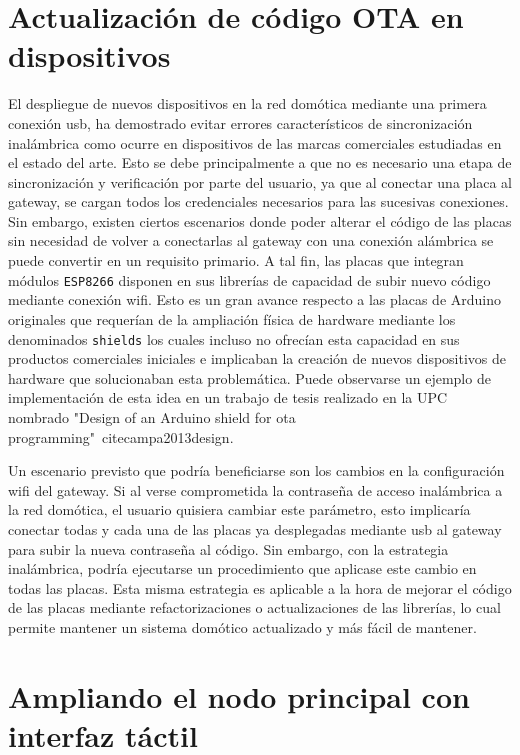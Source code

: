 \section{Actualización de código OTA en dispositivos}
\label{ch:Capitulo6.3}
El despliegue de nuevos dispositivos en la red domótica mediante una primera conexión \gls{usb}, ha demostrado evitar errores característicos de sincronización inalámbrica como ocurre en dispositivos de las marcas comerciales estudiadas en el estado del arte. Esto se debe principalmente a que no es necesario una etapa de sincronización y verificación por parte del usuario, ya que al conectar una placa al \gls{gateway}, se cargan todos los credenciales necesarios para las sucesivas conexiones. Sin embargo, existen ciertos escenarios donde poder alterar el código de las placas sin necesidad de volver a conectarlas al \gls{gateway} con una conexión alámbrica se puede convertir en un requisito primario. A tal fin, las placas que integran módulos \verb|ESP8266| disponen en sus librerías de capacidad de subir nuevo código mediante conexión \gls{wifi}. Esto es un gran avance respecto a las placas de Arduino originales que requerían de la ampliación física de hardware mediante los denominados \verb|shields| los cuales incluso no ofrecían esta capacidad en sus productos comerciales iniciales e implicaban la creación de nuevos dispositivos de hardware que solucionaban esta problemática. Puede observarse un ejemplo de implementación de esta idea en un trabajo de tesis realizado en la UPC nombrado "Design of an Arduino shield for ota programming"~cite{campa2013design}.

\vspace{1cm}

Un escenario previsto que podría beneficiarse son los cambios en la configuración \gls{wifi} del \gls{gateway}. Si al verse comprometida la contraseña de acceso inalámbrica a la red domótica, el usuario quisiera cambiar este parámetro, esto implicaría conectar todas y cada una de las placas ya desplegadas mediante \gls{usb} al \gls{gateway} para subir la nueva contraseña al código. Sin embargo, con la estrategia inalámbrica, podría ejecutarse un procedimiento que aplicase este cambio en todas las placas. Esta misma estrategia es aplicable a la hora de mejorar el código de las placas mediante refactorizaciones o actualizaciones de las librerías, lo cual permite mantener un sistema domótico actualizado y más fácil de mantener.

\section{Ampliando el nodo principal con interfaz táctil}
\label{ch:Capitulo6.4}

